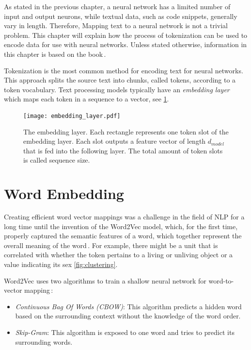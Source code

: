As stated in the previous chapter, a neural network has a limited number of input and output neurons, while textual data, such as code snippets, generally vary in length. Therefore, Mapping text to a neural network is not a trivial problem. This chapter will explain how the process of tokenization can be used to encode data for use with neural networks. Unless stated otherwise, information in this chapter is based on the book\,\cite{SpeechLanguageFeb2024}.

\medskip

Tokenization is the most common method for encoding text for neural networks. This approach splits the source text into chunks, called tokens, according to a token vocabulary. Text processing models typically have an \emph{embedding layer} which maps each token in a sequence to a vector, see \ref{fig:embed}.

\begin{figure}[ht]
  \centering
  \texttt{[image: embedding\_layer.pdf]}
  \caption{The embedding layer. Each rectangle represents one token slot of the embedding layer. Each slot outputs a feature vector of length $d_{model}$ that is fed into the following layer. The total amount of token slots is called sequence size. }
\label{fig:embed}
\end{figure}

\section{Word Embedding}
Creating efficient word vector mappings was a challenge in the field of NLP for a long time until the invention of the Word2Vec model, which, for the first time, properly captured the semantic features of a word, which together represent the overall meaning of the word\,\cite{mikolov2013efficient}. For example, there might be a unit that is correlated with whether the token pertains to a living or unliving object or a value indicating its sex \ref{fig:clustering}.

Word2Vec uses two algorithms to train a shallow neural network for word-to-vector mapping\,\cite{mikolov2013efficient}:
\begin{itemize}
        \item \emph{Continuous Bag Of Words (CBOW)}: This algorithm predicts a hidden word based on the surrounding context without the knowledge of the word order.
        \item \emph{Skip-Gram}: This algorithm is exposed to one word and tries to predict its surrounding words.
\end{itemize}

